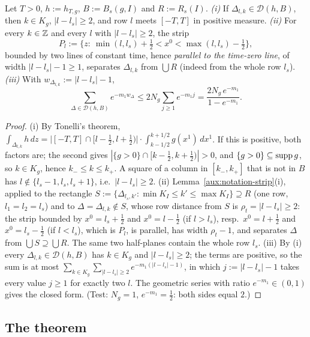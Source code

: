 \begin{auxlemma}\label{aux:d3-geom}
Let $T>0$, $h:=h_{T,g}$, $B:=B_s(g,I)$ and $R:=R_s(I)$.
\emph{(i)} If $\Delta_{l,k}\in\mathcal D(h,B)$, then $k\in K_g$, $|l-l_s|\ge2$, and row $l$ meets
$[-T,T]$ in positive measure.
\emph{(ii)} For every $k\in\mathbb{Z}$ and every $l$ with $|l-l_s|\ge2$, the strip
\[
 P_l:=\bigl\{z:\ \min(l,l_s)+\tfrac12<x^0<\max(l,l_s)-\tfrac12\bigr\},
\]
bounded by two lines of constant time, hence \emph{parallel to the time-zero line}, of width
$|l-l_s|-1\ge1$, separates $\Delta_{l,k}$ from $\bigcup R$ (indeed from the whole row $l_s$).
\emph{(iii)} With $w_{\Delta_{l,k}}:=|l-l_s|-1$,
\[
 \sum_{\Delta\in\mathcal D(h,B)}e^{-m_1w_\Delta}\le2N_g\sum_{j\ge1}e^{-m_1j}
 =\frac{2N_g\,e^{-m_1}}{1-e^{-m_1}} .
\]
\end{auxlemma}

\begin{proof}
(i) By Tonelli's theorem,
$\int_{\Delta_{l,k}}h\,dz=\bigl|[-T,T]\cap[l-\frac12,l+\frac12)\bigr|\cdot
\int_{k-1/2}^{k+1/2}g(x^1)\,dx^1$.  If this is positive, both factors are; the second gives
$|\{g>0\}\cap[k-\frac12,k+\frac12)|>0$, and $\{g>0\}\subseteq\operatorname{supp} g$, so $k\in K_g$, hence
$k_-\le k\le k_+$.  A square of a column in $[k_-,k_+]$ that is not in $B$ has
$l\notin\{l_s-1,l_s,l_s+1\}$, i.e.\ $|l-l_s|\ge2$.
(ii) Lemma~\ref{aux:notation-strip}(i), applied to the rectangle
$S:=\{\Delta_{l_s,k'}:\min K_I\le k'\le\max K_I\}\supseteq R$ (one row, $l_1=l_2=l_s$) and to
$\Delta=\Delta_{l,k}\notin S$, whose row distance from $S$ is $\rho_t=|l-l_s|\ge2$: the strip
bounded by $x^0=l_s+\frac12$ and $x^0=l-\frac12$ (if $l>l_s$), resp.\ $x^0=l+\frac12$ and
$x^0=l_s-\frac12$ (if $l<l_s$), which is $P_l$, is parallel, has width $\rho_t-1$, and separates
$\Delta$ from $\bigcup S\supseteq\bigcup R$.  The same two half-planes contain the whole row $l_s$.
(iii) By (i) every $\Delta_{l,k}\in\mathcal D(h,B)$ has $k\in K_g$ and $|l-l_s|\ge2$; the terms are
positive, so the sum is at most $\sum_{k\in K_g}\sum_{|l-l_s|\ge2}e^{-m_1(|l-l_s|-1)}$, in which
$j:=|l-l_s|-1$ takes every value $j\ge1$ for exactly two $l$.  The geometric series with ratio
$e^{-m_1}\in(0,1)$ gives the closed form.  (Test: $N_g=1$, $e^{-m_1}=\frac12$: both sides equal
$2$.)
\end{proof}

\subsection{The theorem}\label{sub:d3-thm}

